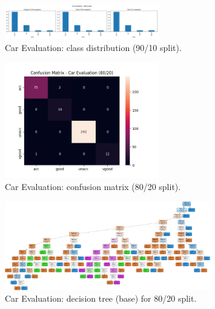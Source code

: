 \begin{figure}[H]
	\centering
	\includegraphics[width=0.6\textwidth]{imgs/class_dist/class_dist__car_evaluation__90_vs_10.png}
	\caption{Car Evaluation: class distribution (90/10 split).}
	\label{fig:ce-cd-90-10}
\end{figure}

\begin{figure}[H]
	\centering
	\includegraphics[width=0.6\textwidth]{imgs/confusion_mat/confusion_mat__car_evaluation__80_vs_20.png}
	\caption{Car Evaluation: confusion matrix (80/20 split).}
	\label{fig:ce-cm-80-20}
\end{figure}

\begin{figure}[H]
	\centering
	\includegraphics[width=0.8\textwidth]{imgs/dt/dt__car_evaluation__80_vs_20.png}
	\caption{Car Evaluation: decision tree (base) for 80/20 split.}
	\label{fig:ce-dt-base}
\end{figure}

